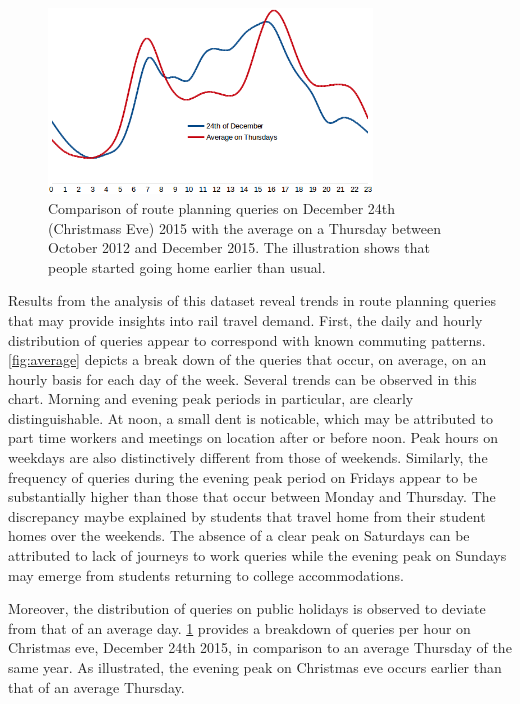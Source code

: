 \documentclass{sig-alternate}
\newcommand{\todo}[1]{\noindent\textcolor{red}{{\bf \{TODO}: #1{\bf \}}}}
\begin{document}
\begin{figure}[h]
\centering
\includegraphics[width=8.6cm]{dec24}
\caption{Comparison of route planning queries on December 24th (Christmass Eve) 2015 with the average on a Thursday between October 2012 and December 2015. The illustration shows that people started going home earlier than usual.}
\label{fig:dec24}
\end{figure}

Results from the analysis of this dataset reveal trends in route planning queries that may provide insights into rail travel demand. 
First, the daily and hourly distribution of queries appear to correspond with known commuting patterns. 
\cref{fig:average} depicts a break down of the queries that occur, on average, on an hourly basis for each day of the week.
Several trends can be observed in this chart. 
Morning and evening peak periods in particular, are clearly distinguishable.
At noon, a small dent is noticable, which may be attributed to part time workers and meetings on location after or before noon.
Peak hours on weekdays are also distinctively different from those of weekends.
Similarly, the frequency of queries during the evening peak period on Fridays appear to be substantially higher than those that occur between Monday and Thursday.
The discrepancy maybe explained by students that travel home from their student homes over the weekends. 
The absence of a clear peak on Saturdays can be attributed to lack of journeys to work queries while the evening peak on Sundays may emerge from students returning to college accommodations.


Moreover, the distribution of queries on public holidays is observed to deviate from that of an average day. 
\cref{fig:dec24} provides a breakdown of queries per hour on Christmas eve, December 24th 2015, in comparison to an average Thursday of the same year. 
As illustrated, the evening peak on Christmas eve occurs earlier than that of an average Thursday. 
\end{document}

